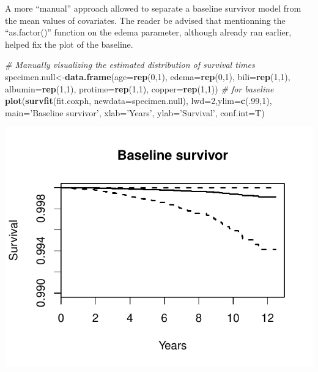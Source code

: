 \documentclass[]{article}
\newenvironment{Shaded}{\begin{snugshade}}{\end{snugshade}}
\newcommand{\KeywordTok}[1]{\textcolor[rgb]{0.13,0.29,0.53}{\textbf{#1}}}
\newcommand{\DataTypeTok}[1]{\textcolor[rgb]{0.13,0.29,0.53}{#1}}
\newcommand{\DecValTok}[1]{\textcolor[rgb]{0.00,0.00,0.81}{#1}}
\newcommand{\StringTok}[1]{\textcolor[rgb]{0.31,0.60,0.02}{#1}}
\newcommand{\CommentTok}[1]{\textcolor[rgb]{0.56,0.35,0.01}{\textit{#1}}}
\newcommand{\NormalTok}[1]{#1}
\begin{document}
A more ``manual'' approach allowed to separate a baseline survivor model
from the mean values of covariates. The reader be advised that
mentionning the ``as.factor()'' function on the edema parameter,
although already ran earlier, helped fix the plot of the baseline.

\begin{Shaded}
\begin{Highlighting}[]
\CommentTok{# Manually visualizing the estimated distribution of survival times}
\NormalTok{specimen.null<-}\KeywordTok{data.frame}\NormalTok{(}\DataTypeTok{age=}\KeywordTok{rep}\NormalTok{(}\DecValTok{0}\NormalTok{,}\DecValTok{1}\NormalTok{), }\DataTypeTok{edema=}\KeywordTok{rep}\NormalTok{(}\DecValTok{0}\NormalTok{,}\DecValTok{1}\NormalTok{), }\DataTypeTok{bili=}\KeywordTok{rep}\NormalTok{(}\DecValTok{1}\NormalTok{,}\DecValTok{1}\NormalTok{), }\DataTypeTok{albumin=}\KeywordTok{rep}\NormalTok{(}\DecValTok{1}\NormalTok{,}\DecValTok{1}\NormalTok{), }
                          \DataTypeTok{protime=}\KeywordTok{rep}\NormalTok{(}\DecValTok{1}\NormalTok{,}\DecValTok{1}\NormalTok{), }\DataTypeTok{copper=}\KeywordTok{rep}\NormalTok{(}\DecValTok{1}\NormalTok{,}\DecValTok{1}\NormalTok{))}
\CommentTok{# for baseline}
\KeywordTok{plot}\NormalTok{(}\KeywordTok{survfit}\NormalTok{(fit.coxph, }\DataTypeTok{newdata=}\NormalTok{specimen.null), }\DataTypeTok{lwd=}\DecValTok{2}\NormalTok{,}\DataTypeTok{ylim=}\KeywordTok{c}\NormalTok{(.}\DecValTok{99}\NormalTok{,}\DecValTok{1}\NormalTok{),}
     \DataTypeTok{main=}\StringTok{'Baseline survivor'}\NormalTok{, }\DataTypeTok{xlab=}\StringTok{'Years'}\NormalTok{, }\DataTypeTok{ylab=}\StringTok{'Survival'}\NormalTok{, }\DataTypeTok{conf.int=}\NormalTok{T)}
\end{Highlighting}
\end{Shaded}

\includegraphics{survival_v5_files/figure-latex/unnamed-chunk-35-1.pdf}
\end{document}
